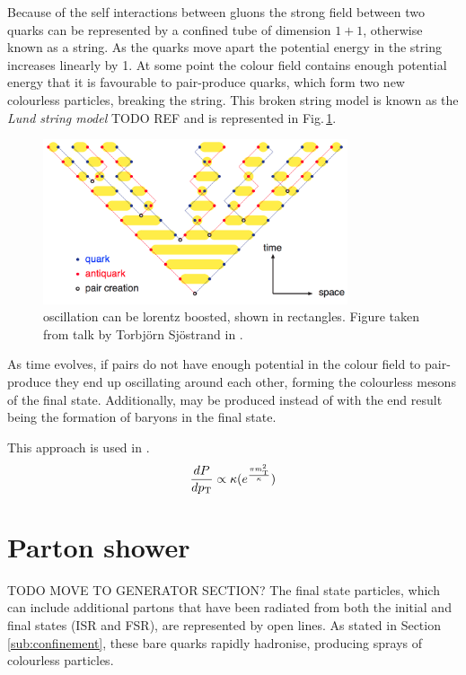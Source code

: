 Because of the self interactions between gluons the strong field between two quarks can be represented by a confined tube of dimension $1+1$, otherwise known as a string. 
As the quarks move apart the potential energy in the string increases linearly by 1\GeV{}\fminv{}.
At some point the colour field contains enough potential energy that it is favourable to pair-produce quarks, which form two new colourless particles, breaking the string.
This broken string model is known as the \textit{Lund string model} TODO REF and is represented in Fig.\,\ref{fig:Lund}.
\begin{figure}[htpb]
	\centering
	\includegraphics[width=0.8\textwidth]{Figures/Generator_Lund}
	\caption[ ]{ oscillation can be lorentz boosted, shown in rectangles. Figure taken from talk by Torbj\"orn Sj\"ostrand in \cite{Gen:Lund}.}
	\label{fig:Lund}
\end{figure}
As time evolves, if \qqbar{} pairs do not have enough potential in the colour field to pair-produce they end up oscillating around each other, forming the colourless mesons of the final state.
Additionally, \qqqbarqbar{} may be produced instead of \qqbar{} with the end result being the formation of baryons in the final state.

This approach is used in \pythia{}.
\begin{equation}
	\frac{dP}{dp_{\mathrm{T}}} \propto \kappa (e^{\frac{\pi m_{\mathrm{T}}^2}{\kappa}})
\end{equation}

\section{Parton shower} %
\label{sub:parton_shower}
TODO MOVE TO GENERATOR SECTION?
The final state particles, which can include additional partons that have been radiated from both the initial and final states (ISR and FSR), are represented by open lines.
As stated in Section\,\ref{sub:confinement}, these bare quarks rapidly hadronise, producing sprays of colourless particles.





